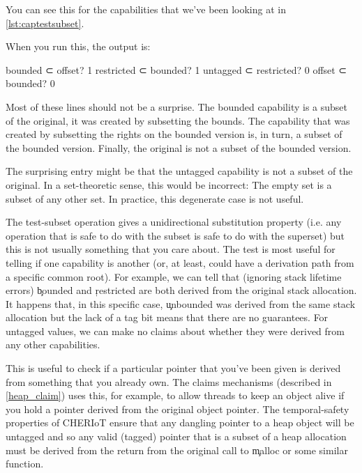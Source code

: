 {{{{{{{{You can see this for the capabilities that we've been looking at in \ref{lst:captestsubset}.

\codelisting[filename=examples/compare_capabilities/example.c,marker=capability_subset,label=lst:captestsubset,caption="Subset relationships over two capabilities."]{}

When you run this, the output is:

\begin{console}
bounded ⊂ offset? 1
restricted ⊂ bounded? 1
untagged ⊂ restricted? 0
offset ⊂ bounded? 0
\end{console}

Most of these lines should not be a surprise.
The bounded capability is a subset of the original, it was created by subsetting the bounds.
The capability that was created by subsetting the rights on the bounded version is, in turn, a subset of the bounded version.
Finally, the original is not a subset of the bounded version.

The surprising entry might be that the untagged capability is not a subset of the original.
In a set-theoretic sense, this would be incorrect: The empty set is a subset of any other set.
In practice, this degenerate case is not useful.

The test-subset operation gives a unidirectional substitution property (i.e. any operation that is safe to do with the subset is safe to do with the superset) but this is not usually something that you care about.
The test is most useful for telling if one capability is  another (or, at least, could have a derivation path from a specific common root).
For example, we can tell that (ignoring stack lifetime errors) \c{bounded} and \c{restricted} are both derived from the original stack allocation.
It happens that, in this specific case, \c{unbounded} was derived from the same stack allocation but the lack of a tag bit means that there are no  guarantees.
For untagged values, we can make no claims about whether they were derived from any other capabilities.

This is useful to check if a particular pointer that you've been given is derived from something that you already own.
The claims mechanisms (described in \ref{heap_claim}) uses this, for example, to allow threads to keep an object alive if you hold a pointer derived from the original object pointer.
The temporal-safety properties of CHERIoT ensure that any dangling pointer to a heap object will be untagged and so any valid (tagged) pointer that is a subset of a heap allocation must be derived from the return from the original call to \c{malloc} or some similar function.

}}}}}}}}
